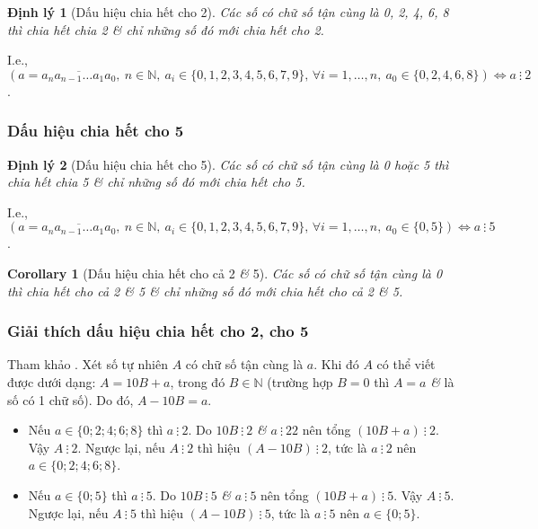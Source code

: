 \documentclass{article}
\numberwithin{equation}{section}
\newtheorem{corollary}{Corollary}[section]
\newtheorem{dinhly}{Định lý}[section]
\begin{document}
\begin{dinhly}[Dấu hiệu chia hết cho 2]
	Các số có chữ số tận cùng là 0, 2, 4, 6, 8 thì chia hết chia 2 \textit{\&} chỉ những số đó mới chia hết cho 2.
\end{dinhly}
I.e., $(a = \overline{a_na_{n-1}\ldots a_1a_0},\ n\in\mathbb{N},\ a_i\in\{0,1,2,3,4,5,6,7,9\},\,\forall i = 1,\ldots,n,\ a_0\in\{0,2,4,6,8\})\Leftrightarrow a\ \vdots\ 2$.

\subsubsection{Dấu hiệu chia hết cho 5}
\begin{dinhly}[Dấu hiệu chia hết cho 5]
	Các số có chữ số tận cùng là 0 hoặc 5 thì chia hết chia 5 \textit{\&} chỉ những số đó mới chia hết cho 5.
\end{dinhly}
I.e., $(a = \overline{a_na_{n-1}\ldots a_1a_0},\ n\in\mathbb{N},\ a_i\in\{0,1,2,3,4,5,6,7,9\},\,\forall i = 1,\ldots,n,\ a_0\in\{0,5\})\Leftrightarrow a\ \vdots\ 5$.

\begin{corollary}[Dấu hiệu chia hết cho cả 2 \textit{\&} 5]
	Các số có chữ số tận cùng là 0 thì chia hết cho cả 2 \textit{\&} 5 \textit{\&} chỉ những số đó mới chia hết cho cả 2 \textit{\&} 5.
\end{corollary}

\subsubsection{Giải thích dấu hiệu chia hết cho 2, cho 5}
Tham khảo \cite[p. 37]{SGK_Toan_6_Canh_Dieu_tap_1}. Xét số tự nhiên $A$ có chữ số tận cùng là $a$. Khi đó $A$ có thể viết được dưới dạng: $A = 10B + a$, trong đó $B\in\mathbb{N}$ (trường hợp $B = 0$ thì $A = a$ \textit{\&} là số có 1 chữ số). Do đó, $A - 10 B = a$.
\begin{itemize}
	\item Nếu $a\in\{0;2;4;6;8\}$ thì $a\ \vdots\ 2$. Do $10B\ \vdots\ 2$ \textit{\&} $a\ \vdots\ 2 2$ nên tổng $(10B + a)\ \vdots\ 2$. Vậy $A\ \vdots\ 2$. Ngược lại, nếu $A\ \vdots\ 2$ thì hiệu $(A - 10B)\ \vdots\ 2$, tức là $a\ \vdots\ 2$ nên $a\in\{0;2;4;6;8\}$.
	\item Nếu $a\in\{0;5\}$ thì $a\ \vdots\ 5$. Do $10B\ \vdots\ 5$ \textit{\&} $a\ \vdots\ 5$ nên tổng $(10B + a)\ \vdots\ 5$. Vậy $A\ \vdots\ 5$. Ngược lại, nếu $A\ \vdots\ 5$ thì hiệu $(A - 10B)\ \vdots\ 5$, tức là $a\ \vdots\ 5$ nên $a\in\{0;5\}$.
\end{itemize}
\end{document}
